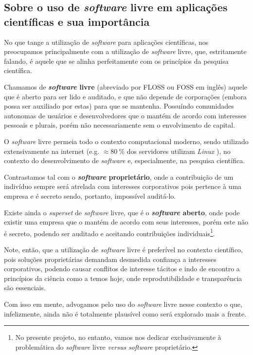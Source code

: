 \documentclass[10pt, a4paper, conference, onecolumn]{IEEEtran}
\begin{document}
\subsection{Sobre o uso de \textit{software} livre em aplicações científicas e sua importância}\label{sec:soft-livre}

No que tange a utilização de \textit{software} para aplicações científicas, nos
preocupamos principalmente com a utilização de \textit{software} livre, que,
estritamente falando, é aquele que se alinha perfeitamente com os princípios da
pesquisa científica.

Chamamos de \textbf{\textit{software} livre} (abreviado por FLOSS ou FOSS em
inglês) aquele que é aberto para ser lido e auditado, e que não depende de
corporações (embora possa ser auxiliado por estas) para que se mantenha.
Possuíndo comunidades autonomas de usuários e desenvolvedores que o mantém de
acordo com interesses pessoais e plurais, porém não necessariamente sem o
envolvimento de capital.

O \textit{software} livre permeia todo o contexto computacional moderno, sendo
utilizado extensivamente na internet (e.g. $\approx \qty{80}{\percent}$ dos
servidores utilizam \textit{Linux} \cite{w3techs}), no contexto do
desenvolvimento de \textit{software} e, especialmente, na pesquisa científica.

Contrastamos tal com o \textbf{\textit{software} proprietário}, onde a
contribuição de um indivíduo sempre será atrelada com interesses corporativos
pois pertence à uma empresa e é secreto sendo, portanto, impossível auditá-lo.

Existe ainda o \textit{superset} de \textit{software} livre, que é o
\textbf{\textit{software} aberto}, onde pode existir uma empresa que o mantém
de acordo com seus interesses, porém este não é secreto, podendo ser auditado e
aceitando contribuições individuais\footnote{
    No presente projeto, no entanto, vamos nos dedicar exclusivamente à
    problemática do \textit{software} livre \textit{versus} \textit{software}
    proprietário.
}.

Note, então, que a utilização de \textit{software} livre é preferível no
contexto científico, pois soluções proprietárias demandam desmedida confiança a
interesses corporativos, podendo causar conflitos de interesse tácitos e indo
de encontro a princípios da ciência como a temos hoje, onde reprodutibilidade e
transparência são essenciais.

Com isso em mente, advogamos pelo uso do \textit{software} livre nesse contexto
o que, infelizmente, ainda não é totalmente plausível como será explorado mais
a frente.
\end{document}
